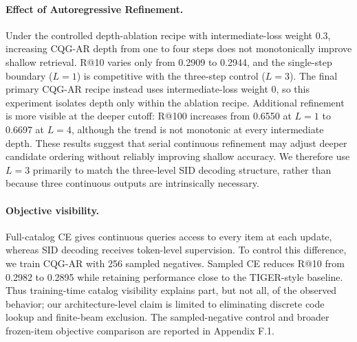 \documentclass[letterpaper]{article}
\begin{document}
\paragraph{Effect of Autoregressive Refinement.}
Under the controlled depth-ablation recipe with intermediate-loss weight 0.3,
increasing CQG-AR depth from one to four steps does not monotonically improve
shallow retrieval. R@10 varies only from 0.2909 to 0.2944, and the single-step
boundary ($L=1$) is competitive with the three-step control ($L=3$).
The final primary CQG-AR recipe instead uses intermediate-loss weight 0, so
this experiment isolates depth only within the ablation recipe. Additional refinement is more visible at the deeper cutoff:
R@100 increases from 0.6550 at $L=1$ to 0.6697 at $L=4$, although the trend is
not monotonic at every intermediate depth. These results suggest that serial
continuous refinement may adjust deeper candidate ordering without reliably
improving shallow accuracy. We therefore use $L=3$ primarily to match the
three-level SID decoding structure, rather than because three continuous
outputs are intrinsically necessary.

\paragraph{Objective visibility.}
Full-catalog CE gives continuous queries access to every item at each update,
whereas SID decoding receives token-level supervision. To control this
difference, we train CQG-AR with 256 sampled negatives. Sampled CE reduces
R@10 from 0.2982 to 0.2895 while retaining performance close to the
TIGER-style baseline. Thus training-time catalog visibility explains part,
but not all, of the observed behavior; our architecture-level claim is
limited to eliminating discrete code lookup and finite-beam exclusion.
The sampled-negative control and broader frozen-item objective comparison are
reported in Appendix F.1.

\end{document}
